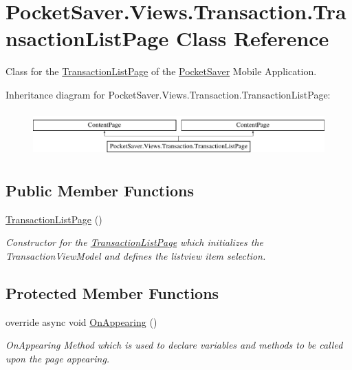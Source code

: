 \hypertarget{class_pocket_saver_1_1_views_1_1_transaction_1_1_transaction_list_page}{}\section{Pocket\+Saver.\+Views.\+Transaction.\+Transaction\+List\+Page Class Reference}
\label{class_pocket_saver_1_1_views_1_1_transaction_1_1_transaction_list_page}


Class for the \hyperlink{class_pocket_saver_1_1_views_1_1_transaction_1_1_transaction_list_page}{Transaction\+List\+Page} of the \hyperlink{namespace_pocket_saver}{Pocket\+Saver} Mobile Application.  


Inheritance diagram for Pocket\+Saver.\+Views.\+Transaction.\+Transaction\+List\+Page\+:\begin{figure}[H]
\begin{center}
\leavevmode
\includegraphics[height=1.761006cm]{class_pocket_saver_1_1_views_1_1_transaction_1_1_transaction_list_page}
\end{center}
\end{figure}
\subsection*{Public Member Functions}
\begin{DoxyCompactItemize}
\item 
\hyperlink{class_pocket_saver_1_1_views_1_1_transaction_1_1_transaction_list_page_ac38869636ca8f6dc89b37145bb838733}{Transaction\+List\+Page} ()
\begin{DoxyCompactList}\small\item\em Constructor for the \hyperlink{class_pocket_saver_1_1_views_1_1_transaction_1_1_transaction_list_page}{Transaction\+List\+Page} which initializes the Transaction\+View\+Model and defines the listview item selection. \end{DoxyCompactList}\end{DoxyCompactItemize}
\subsection*{Protected Member Functions}
\begin{DoxyCompactItemize}
\item 
override async void \hyperlink{class_pocket_saver_1_1_views_1_1_transaction_1_1_transaction_list_page_a8af1a929634ca8eb26dadd56d6d02fc4}{On\+Appearing} ()
\begin{DoxyCompactList}\small\item\em On\+Appearing Method which is used to declare variables and methods to be called upon the page appearing. \end{DoxyCompactList}\end{DoxyCompactItemize}


